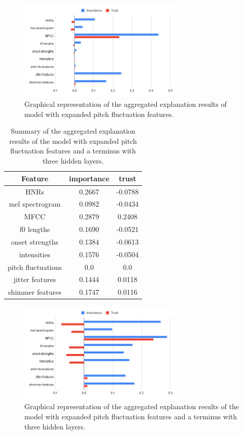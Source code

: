 \documentclass{article}
\begin{document}
		\begin{figure}
			\centering
			\includegraphics[width=0.7\textwidth]{images/exp_mpf.png}
			\caption{Graphical representation of the aggregated explanation results of model with
			expanded pitch fluctuation features.}
			\label{fig:exp_mpf}
		\end{figure}
		\begin{table}[htbp]
			\centering
			\begin{tabular}{c | c | c}
				Feature & importance & trust \\
				\hline
				HNRs & 0.2667 & -0.0788 \\
				mel spectrogram & 0.0982 & -0.0434 \\
				MFCC & 0.2879 & 0.2408 \\
				f0 lengths & 0.1690 & -0.0521 \\
				onset strengths & 0.1384 & -0.0613 \\
				intensities & 0.1576 & -0.0504 \\
				pitch fluctuations & 0.0 & 0.0 \\
				jitter features & 0.1444 & 0.0118 \\
				shimmer features & 0.1747 & 0.0116
			\end{tabular}
			\caption{Summary of the aggregated explanation results of the model with expanded
			pitch fluctuation features and a terminus with three hidden layers.}
			\label{table:exp-results-mpf-cterm}
		\end{table}
		\begin{figure}
			\centering
			\includegraphics[width=0.7\textwidth]{images/exp_mpf_cterm.png}
			\caption{Graphical representation of the aggregated explanation results of the model
			with expanded pitch fluctuation features and a terminus with three hidden layers.}
			\label{fig:exp_mpf_cterm}
		\end{figure}
\end{document}
